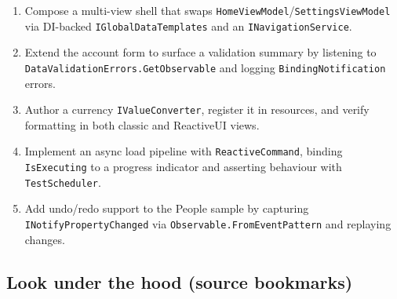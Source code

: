 \begin{enumerate}
\def\labelenumi{\arabic{enumi}.}
\tightlist
\item
  Compose a multi-view shell that swaps
  \passthrough{\lstinline!HomeViewModel!}/\passthrough{\lstinline!SettingsViewModel!}
  via DI-backed \passthrough{\lstinline!IGlobalDataTemplates!} and an
  \passthrough{\lstinline!INavigationService!}.
\item
  Extend the account form to surface a validation summary by listening
  to \passthrough{\lstinline!DataValidationErrors.GetObservable!} and
  logging \passthrough{\lstinline!BindingNotification!} errors.
\item
  Author a currency \passthrough{\lstinline!IValueConverter!}, register
  it in resources, and verify formatting in both classic and ReactiveUI
  views.
\item
  Implement an async load pipeline with
  \passthrough{\lstinline!ReactiveCommand!}, binding
  \passthrough{\lstinline!IsExecuting!} to a progress indicator and
  asserting behaviour with \passthrough{\lstinline!TestScheduler!}.
\item
  Add undo/redo support to the People sample by capturing
  \passthrough{\lstinline!INotifyPropertyChanged!} via
  \passthrough{\lstinline!Observable.FromEventPattern!} and replaying
  changes.
\end{enumerate}

\subsection{Look under the hood (source
bookmarks)}\label{look-under-the-hood-source-bookmarks-9}

